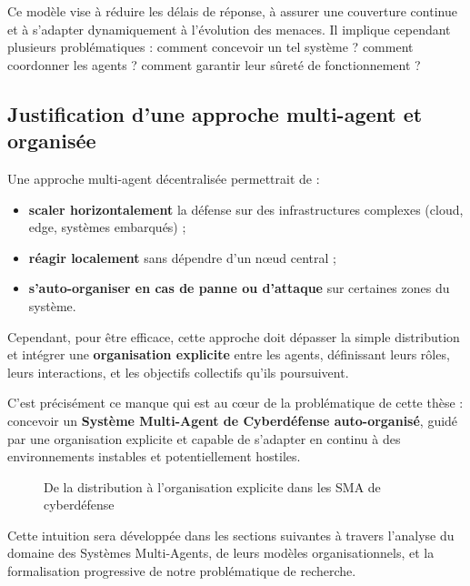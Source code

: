 \documentclass[ twoside,openright,titlepage,numbers=noenddot,headinclude,%
                footinclude=true,cleardoublepage=empty,abstractoff, %
                BCOR=5mm,paper=a4,fontsize=11pt,%
                french,american,%
                ]{scrreprt}
\begin{document}
Ce modèle vise à réduire les délais de réponse, à assurer une couverture continue et à s'adapter dynamiquement à l'évolution des menaces. Il implique cependant plusieurs problématiques : comment concevoir un tel système ? comment coordonner les agents ? comment garantir leur sûreté de fonctionnement ?

\vspace{0.5em}
\subsection*{Justification d'une approche multi-agent et organisée}

Une approche multi-agent décentralisée permettrait de :
\begin{itemize}
    \item \textbf{scaler horizontalement} la défense sur des infrastructures complexes (cloud, edge, systèmes embarqués) ;
    \item \textbf{réagir localement} sans dépendre d'un nœud central ;
    \item \textbf{s'auto-organiser en cas de panne ou d'attaque} sur certaines zones du système.
\end{itemize}

Cependant, pour être efficace, cette approche doit dépasser la simple distribution et intégrer une \textbf{organisation explicite} entre les agents, définissant leurs rôles, leurs interactions, et les objectifs collectifs qu'ils poursuivent.

C'est précisément ce manque qui est au cœur de la problématique de cette thèse : concevoir un \textbf{Système Multi-Agent de Cyberdéfense auto-organisé}, guidé par une organisation explicite et capable de s'adapter en continu à des environnements instables et potentiellement hostiles.

\begin{figure}[H]
    \centering
    \caption{De la distribution à l'organisation explicite dans les SMA de cyberdéfense}
    \label{fig:orga-sma-cyber}
\end{figure}

Cette intuition sera développée dans les sections suivantes à travers l'analyse du domaine des Systèmes Multi-Agents, de leurs modèles organisationnels, et la formalisation progressive de notre problématique de recherche.
\end{document}

